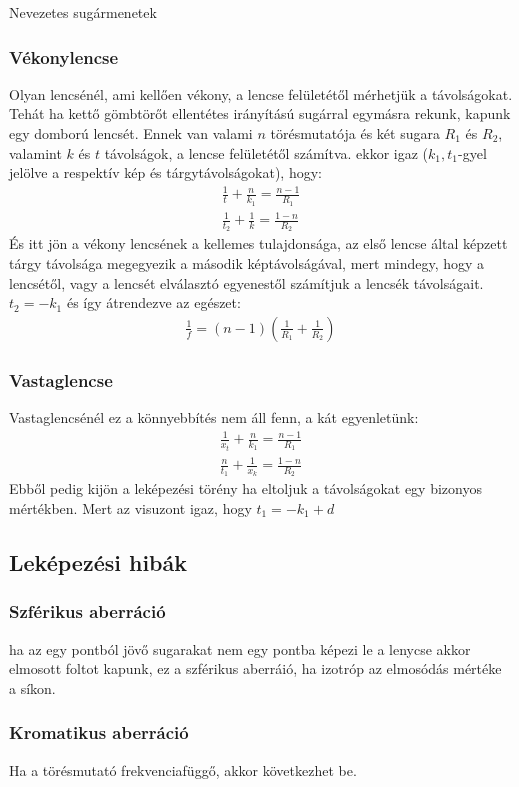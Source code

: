 \documentclass{article}
\begin{document}
Nevezetes sugármenetek
\subsubsection{Vékonylencse}
Olyan lencsénél, ami kellően vékony, a lencse felületétől mérhetjük a távolságokat. Tehát ha kettő gömbtörőt ellentétes irányítású sugárral egymásra rekunk, kapunk egy domború lencsét. Ennek van valami $n$ törésmutatója és két sugara $R_1$ és $R_2$, valamint $k$ és $t$ távolságok, a lencse felületétől számítva. ekkor igaz ($k_1,t_1$-gyel jelölve a respektív kép és tárgytávolságokat), hogy:
\begin{gather*}
\frac{1}{t} + \frac{n}{k_1} = \frac{n-1}{R_1} \\
\frac{1}{t_2} + \frac{1}{k} = \frac{1-n}{R_2} 
\end{gather*}
És itt jön a vékony lencsének a kellemes tulajdonsága, az első lencse által képzett tárgy távolsága megegyezik a második képtávolságával, mert mindegy, hogy a lencsétől, vagy a lencsét elválasztó egyenestől számítjuk a lencsék távolságait. $t_2 = -k_1$ és így átrendezve az egészet:
\begin{gather*}
\frac{1}{f} = (n-1)\left( \frac{1}{R_1} + \frac{1}{R_2} \right)
\end{gather*}
\subsubsection{Vastaglencse}
Vastaglencsénél ez a könnyebbítés nem áll fenn, a kát egyenletünk:
\begin{gather*}
\frac{1}{x_t} + \frac{n}{k_1} = \frac{n-1}{R_1} \\
\frac{n}{t_1} + \frac{1}{x_k} = \frac{1-n}{R_2} 
\end{gather*}
Ebből pedig kijön a leképezési törény ha eltoljuk a távolságokat egy bizonyos mértékben. Mert az visuzont igaz, hogy $t_1= -k_1+d$
\subsection{Leképezési hibák}
\subsubsection{Szférikus aberráció}
ha az egy pontból jövő sugarakat nem egy pontba képezi le a lenycse akkor elmosott foltot kapunk, ez a szférikus aberráió, ha izotróp az elmosódás mértéke a síkon.
\subsubsection{Kromatikus aberráció}
Ha a törésmutató frekvenciafüggő, akkor következhet be.
\end{document}
